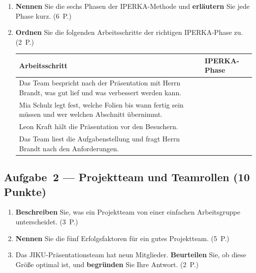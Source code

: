 \documentclass[11pt, a4paper]{article}
\begin{document}
\begin{enumerate}[label=(\alph*)]
  \item \textbf{Nennen} Sie die sechs Phasen der IPERKA-Methode und \textbf{erläutern} Sie
  jede Phase kurz. \hfill (6~P.)

  \vspace{9cm}

  \item \textbf{Ordnen} Sie die folgenden Arbeitsschritte der richtigen IPERKA-Phase zu. \hfill (2~P.)

  \bigskip

  \noindent
  \begin{tabular}{|p{9cm}|p{3.5cm}|}
  \hline
  \textbf{Arbeitsschritt} & \textbf{IPERKA-Phase}\\
  \hline
  Das Team bespricht nach der Präsentation mit Herrn Brandt, was gut lief und was verbessert werden kann. & \\[0.8cm]
  \hline
  Mia Schulz legt fest, welche Folien bis wann fertig sein müssen und wer welchen Abschnitt übernimmt. & \\[0.8cm]
  \hline
  Leon Kraft hält die Präsentation vor den Besuchern. & \\[0.8cm]
  \hline
  Das Team liest die Aufgabenstellung und fragt Herrn Brandt nach den Anforderungen. & \\[0.8cm]
  \hline
  \end{tabular}
\end{enumerate}

\subsection*{Aufgabe~2 --- Projektteam und Teamrollen (10 Punkte)}

\begin{enumerate}[label=(\alph*)]
  \item \textbf{Beschreiben} Sie, was ein Projektteam von einer einfachen Arbeitsgruppe unterscheidet. \hfill (3~P.)

  \vspace{5cm}

  \item \textbf{Nennen} Sie die fünf Erfolgsfaktoren für ein gutes Projektteam. \hfill (5~P.)

  \vspace{7cm}

  \item Das JIKU-Präsentationsteam hat neun Mitglieder. \textbf{Beurteilen} Sie, ob diese
  Größe optimal ist, und \textbf{begründen} Sie Ihre Antwort. \hfill (2~P.)

  \vspace{4cm}
\end{enumerate}
\end{document}
